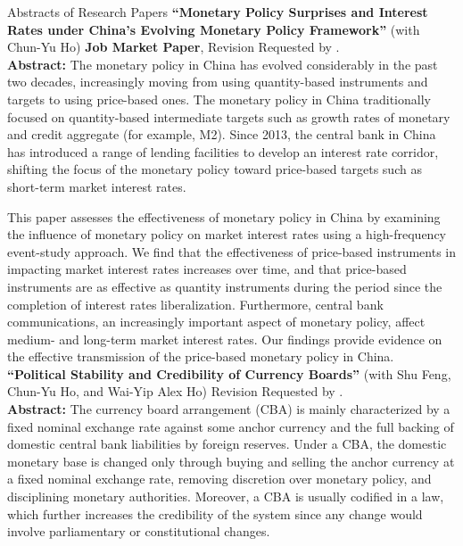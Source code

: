 \documentclass{resume_liang} %
\begin{document}
\begin{rSection}{Abstracts of Research Papers}
	\textbf{``Monetary Policy Surprises and Interest Rates under China's Evolving Monetary Policy Framework''} (with Chun-Yu Ho) \textbf{Job Market Paper}, Revision Requested by \textit{\color{blue}{Emerging Markets Review}}.\vspace{0.1cm}\\ 
	\textbf{Abstract:} The monetary policy in China has evolved considerably in the past two decades, increasingly moving from using quantity-based instruments and targets to using price-based ones. The monetary policy in China traditionally focused on quantity-based intermediate targets such as growth rates of monetary and credit aggregate (for example, M2). Since 2013, the central bank in China has introduced a range of lending facilities to develop an interest rate corridor, shifting the focus of the monetary policy toward price-based targets such as short-term market interest rates.  
	
	This paper assesses the effectiveness of monetary policy in China by examining the influence of monetary policy on market interest rates using a high-frequency event-study approach. We find that the effectiveness of price-based instruments in impacting market interest rates increases over time, and that price-based instruments are as effective as quantity instruments during the period since the completion of interest rates liberalization. Furthermore, central bank communications, an increasingly important aspect of monetary policy, affect medium- and long-term market interest rates. Our findings provide evidence on the effective transmission of the price-based monetary policy in China. \\
	
	\textbf{``Political Stability and Credibility of Currency Boards''} (with Shu Feng, Chun-Yu Ho, and Wai-Yip Alex Ho) Revision Requested by \textit{\color{blue}{Journal of International Money and Finance}}.\vspace{0.1cm}\\
	\textbf{Abstract:} The currency board arrangement (CBA) is mainly characterized by a fixed nominal exchange rate against some anchor currency and the full backing of domestic central bank liabilities by foreign reserves. Under a CBA, the domestic monetary base is changed only through buying and selling the anchor currency at a fixed nominal exchange rate, removing discretion over monetary policy, and disciplining monetary authorities. Moreover, a CBA is usually codified in a law, which further increases the credibility of the system since any change would involve parliamentary or constitutional changes.  
	

\end{rSection}
\end{document}
